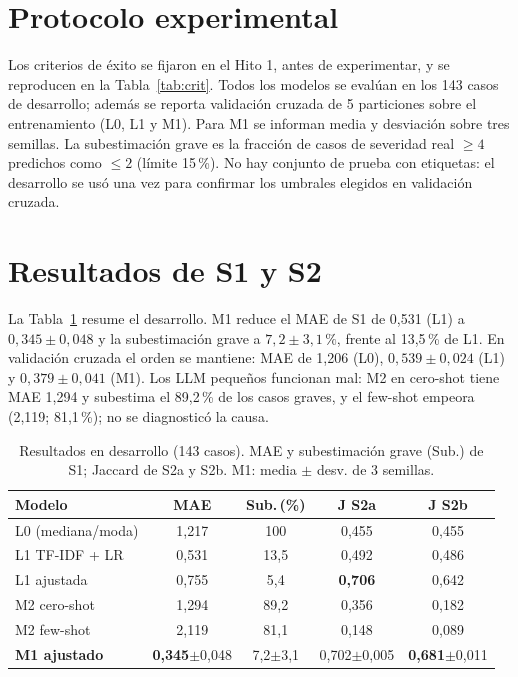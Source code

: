 \documentclass[conference]{IEEEtran}
\begin{document}
\section{Protocolo experimental}\label{sec:proto-exp}
Los criterios de éxito se fijaron en el Hito 1, antes de experimentar, y se reproducen en la Tabla~\ref{tab:crit}. Todos los modelos se evalúan en los 143 casos de desarrollo; además se reporta validación cruzada de 5 particiones sobre el entrenamiento (L0, L1 y M1). Para M1 se informan media y desviación sobre tres semillas. La subestimación grave es la fracción de casos de severidad real $\ge 4$ predichos como $\le 2$ (límite 15\,\%). No hay conjunto de prueba con etiquetas: el desarrollo se usó una vez para confirmar los umbrales elegidos en validación cruzada.

\section{Resultados de S1 y S2}
La Tabla~\ref{tab:res} resume el desarrollo. M1 reduce el MAE de S1 de 0,531 (L1) a $0{,}345\pm0{,}048$ y la subestimación grave a $7{,}2\pm3{,}1\,\%$, frente al 13,5\,\% de L1. En validación cruzada el orden se mantiene: MAE de 1,206 (L0), $0{,}539\pm0{,}024$ (L1) y $0{,}379\pm0{,}041$ (M1). Los LLM pequeños funcionan mal: M2 en cero-shot tiene MAE 1,294 y subestima el 89,2\,\% de los casos graves, y el few-shot empeora (2,119; 81,1\,\%); no se diagnosticó la causa.

\begin{table}[t]
\centering
\caption{Resultados en desarrollo (143 casos). MAE y subestimación grave (Sub.) de S1; Jaccard de S2a y S2b. M1: media $\pm$ desv. de 3 semillas.}
\label{tab:res}
\footnotesize
\setlength{\tabcolsep}{3pt}
\begin{tabular}{@{}lcccc@{}}
\toprule
Modelo & MAE & Sub.\,(\%) & J S2a & J S2b \\
\midrule
L0 (mediana/moda) & 1,217 & 100 & 0,455 & 0,455 \\
L1 TF-IDF + LR & 0,531 & 13,5 & 0,492 & 0,486 \\
L1 ajustada & 0,755 & 5,4 & \textbf{0,706} & 0,642 \\
M2 cero-shot & 1,294 & 89,2 & 0,356 & 0,182 \\
M2 few-shot & 2,119 & 81,1 & 0,148 & 0,089 \\
\textbf{M1 ajustado} & \textbf{0,345}$\pm$0,048 & 7,2$\pm$3,1 & 0,702$\pm$0,005 & \textbf{0,681}$\pm$0,011 \\
\bottomrule
\end{tabular}
\end{table}
\end{document}
